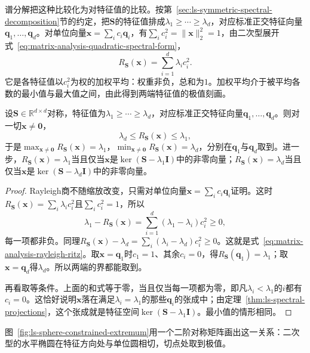 谱分解把这种比较化为对特征值的比较。按第~\ref{sec:ls-symmetric-spectral-decomposition}节的约定，把$\bm S$的特征值排成$\lambda_1\geq\cdots\geq\lambda_d$，对应标准正交特征向量$\bm q_1,\ldots,\bm q_d$。对单位向量$\bm x=\sum_ic_i\bm q_i$，有$\sum_ic_i^2=\lVert\bm x\rVert_2^2=1$，由二次型展开式~\eqref{eq:matrix-analysis-quadratic-spectral-form}，
\[
 R_{\bm S}(\bm x)=\sum_{i=1}^d\lambda_ic_i^2 .
\]
它是各特征值以$c_i^2$为权的加权平均：权重非负，总和为$1$。加权平均介于被平均各数的最小值与最大值之间，由此得到两端特征值的极值刻画。

\begin{theorem}
\label{thm:matrix-analysis-rayleigh-ritz}
设$\bm S\in\mathbb R^{d\times d}$对称，特征值为$\lambda_1\geq\cdots\geq\lambda_d$，对应标准正交特征向量$\bm q_1,\ldots,\bm q_d$。则对一切$\bm x\neq\bm0$，
\begin{equation}
 \lambda_d\leq R_{\bm S}(\bm x)\leq\lambda_1 ,
 \label{eq:matrix-analysis-rayleigh-ritz}
\end{equation}
于是$\max_{\bm x\neq\bm0}R_{\bm S}(\bm x)=\lambda_1$，$\min_{\bm x\neq\bm0}R_{\bm S}(\bm x)=\lambda_d$，分别在$\bm q_1$与$\bm q_d$取到。进一步，$R_{\bm S}(\bm x)=\lambda_1$当且仅当$\bm x$是$\ker(\bm S-\lambda_1\bm I)$中的非零向量；$R_{\bm S}(\bm x)=\lambda_d$当且仅当$\bm x$是$\ker(\bm S-\lambda_d\bm I)$中的非零向量。
\end{theorem}
\begin{proof}
Rayleigh商不随缩放改变，只需对单位向量$\bm x=\sum_ic_i\bm q_i$证明。这时$R_{\bm S}(\bm x)=\sum_i\lambda_ic_i^2$且$\sum_ic_i^2=1$，所以
\[
 \lambda_1-R_{\bm S}(\bm x)=\sum_{i=1}^d(\lambda_1-\lambda_i)c_i^2\geq0 ,
\]
每一项都非负。同理$R_{\bm S}(\bm x)-\lambda_d=\sum_i(\lambda_i-\lambda_d)c_i^2\geq0$。这就是式~\eqref{eq:matrix-analysis-rayleigh-ritz}。取$\bm x=\bm q_1$时$c_1=1$、其余$c_i=0$，得$R_{\bm S}(\bm q_1)=\lambda_1$；取$\bm x=\bm q_d$得$\lambda_d$。所以两端的界都能取到。

再看取等条件。上面的和式等于零，当且仅当每一项都为零，即凡$\lambda_i<\lambda_1$的$i$都有$c_i=0$。这恰好说明$\bm x$落在满足$\lambda_i=\lambda_1$的那些$\bm q_i$的张成中；由定理~\ref{thm:ls-spectral-projections}，这个张成就是特征空间$\ker(\bm S-\lambda_1\bm I)$。最小值的情形相同。
\end{proof}

图~\ref{fig:ls-sphere-constrained-extremum}用一个二阶对称矩阵画出这一关系：二次型的水平椭圆在特征方向处与单位圆相切，切点处取到极值。

